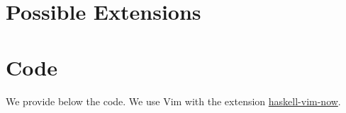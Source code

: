 \documentclass[12pt,a4paper,titlepage]{article}
\begin{document}
\newpage
\section{Possible Extensions}
\label{sec:ext}



\newpage
\appendix

\section{Code} \label{apx:code}
We provide below the code. We use Vim with the extension 
\href{https://github.com/begriffs/haskell-vim-now}{haskell-vim-now}.
\end{document}
